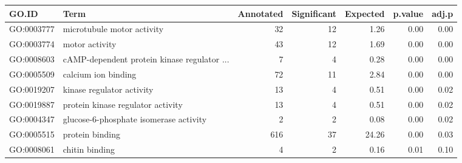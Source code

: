 \begin{table}[ht]
\centering
\begin{tabular}{llrrrrr}
  \hline
GO.ID & Term & Annotated & Significant & Expected & p.value & adj.p \\ 
  \hline
GO:0003777 & microtubule motor activity &  32 &  12 & 1.26 & 0.00 & 0.00 \\ 
  GO:0003774 & motor activity &  43 &  12 & 1.69 & 0.00 & 0.00 \\ 
  GO:0008603 & cAMP-dependent protein kinase regulator ... &   7 &   4 & 0.28 & 0.00 & 0.00 \\ 
  GO:0005509 & calcium ion binding &  72 &  11 & 2.84 & 0.00 & 0.00 \\ 
  GO:0019207 & kinase regulator activity &  13 &   4 & 0.51 & 0.00 & 0.02 \\ 
  GO:0019887 & protein kinase regulator activity &  13 &   4 & 0.51 & 0.00 & 0.02 \\ 
  GO:0004347 & glucose-6-phosphate isomerase activity &   2 &   2 & 0.08 & 0.00 & 0.02 \\ 
  GO:0005515 & protein binding & 616 &  37 & 24.26 & 0.00 & 0.03 \\ 
  GO:0008061 & chitin binding &   4 &   2 & 0.16 & 0.01 & 0.10 \\ 
   \hline
\end{tabular}
\end{table}
